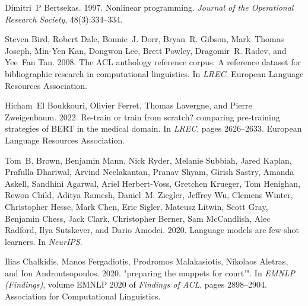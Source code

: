 \documentclass[11pt]{article}
\begin{document}
\begin{thebibliography}{59}
Dimitri~P Bertsekas. 1997.
\newblock Nonlinear programming.
\newblock \emph{Journal of the Operational Research Society}, 48(3):334--334.

Steven Bird, Robert Dale, Bonnie~J. Dorr, Bryan~R. Gibson, Mark~Thomas Joseph,
  Min{-}Yen Kan, Dongwon Lee, Brett Powley, Dragomir~R. Radev, and Yee~Fan Tan.
  2008.
\newblock The {ACL} anthology reference corpus: {A} reference dataset for
  bibliographic research in computational linguistics.
\newblock In \emph{{LREC}}. European Language Resources Association.

Hicham~El Boukkouri, Olivier Ferret, Thomas Lavergne, and Pierre Zweigenbaum.
  2022.
\newblock Re-train or train from scratch? comparing pre-training strategies of
  {BERT} in the medical domain.
\newblock In \emph{{LREC}}, pages 2626--2633. European Language Resources
  Association.

Tom~B. Brown, Benjamin Mann, Nick Ryder, Melanie Subbiah, Jared Kaplan,
  Prafulla Dhariwal, Arvind Neelakantan, Pranav Shyam, Girish Sastry, Amanda
  Askell, Sandhini Agarwal, Ariel Herbert{-}Voss, Gretchen Krueger, Tom
  Henighan, Rewon Child, Aditya Ramesh, Daniel~M. Ziegler, Jeffrey Wu, Clemens
  Winter, Christopher Hesse, Mark Chen, Eric Sigler, Mateusz Litwin, Scott
  Gray, Benjamin Chess, Jack Clark, Christopher Berner, Sam McCandlish, Alec
  Radford, Ilya Sutskever, and Dario Amodei. 2020.
\newblock Language models are few-shot learners.
\newblock In \emph{NeurIPS}.

Ilias Chalkidis, Manos Fergadiotis, Prodromos Malakasiotis, Nikolaos Aletras,
  and Ion Androutsopoulos. 2020.
 "preparing the muppets for court'".
\newblock In \emph{{EMNLP} (Findings)}, volume {EMNLP} 2020 of \emph{Findings
  of {ACL}}, pages 2898--2904. Association for Computational Linguistics.


\end{thebibliography}
\end{document}
